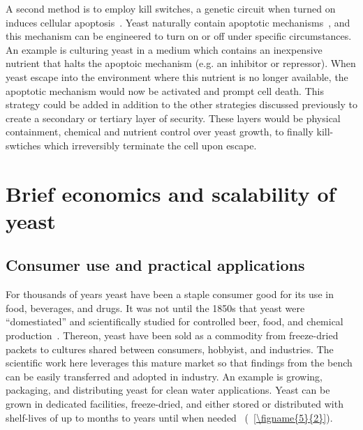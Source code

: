 \documentclass[../main/main]{subfiles}
\begin{document}
A second method is to employ kill switches, a genetic circuit when turned on induces cellular apoptosis~\cite{chan2016}. Yeast naturally contain apoptotic mechanisms~\cite{skulachev2002programmed}, and this mechanism can be engineered to turn on or off under specific circumstances. An example is culturing yeast in a medium which contains an inexpensive nutrient that halts the apoptoic mechanism (e.g. an inhibitor or repressor). When yeast escape into the environment where this nutrient is no longer available, the apoptotic mechanism would now be activated and prompt cell death. This strategy could be added in addition to the other strategies discussed previously to create a secondary or tertiary layer of security. These layers would be physical containment, chemical and nutrient control over yeast growth, to finally kill-swtiches which irreversibly terminate the cell upon escape.

\section{Brief economics and scalability of yeast}
\label{section:chapter5:economics}

\subsection{Consumer use and practical applications}
For thousands of years yeast have been a staple consumer good for its use in food, beverages, and drugs. It was not until the 1850s that yeast were ``domestiated'' and scientifically studied for controlled beer, food, and chemical production~\cite{greig2009}. Thereon, yeast have been sold as a commodity from freeze-dried packets to cultures shared between consumers, hobbyist, and industries. The scientific work here leverages this mature market so that findings from the bench can be easily transferred and adopted in industry. An example is growing, packaging, and distributing yeast for clean water applications. Yeast can be grown in dedicated facilities, freeze-dried, and either stored or distributed with shelf-lives of up to months to years until when needed~\cite{lodato1999viability} (\FIGURE~\ref{\figname{5}{2}}).
\end{document}
